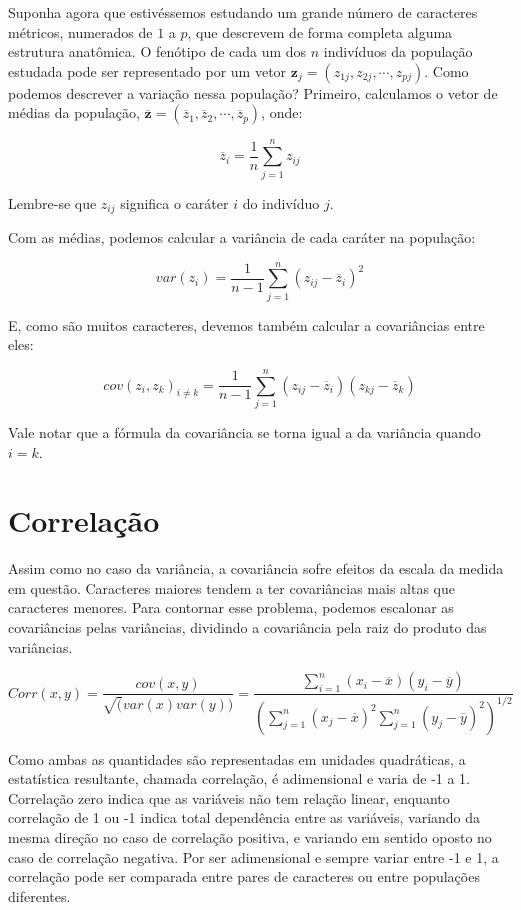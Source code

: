 \documentclass[portuges,]{tufte-handout}
\begin{document}
Suponha agora que estivéssemos estudando um grande número de caracteres
métricos, numerados de $1$ a $p$, que descrevem de forma completa alguma
estrutura anatômica. O fenótipo de cada um dos $n$ indivíduos da
população estudada pode ser representado por um vetor
$\mathbf{z}_j = (z_{1j}, z_{2j}, \cdots, z_{pj})$. Como podemos
descrever a variação nessa população? Primeiro, calculamos o vetor de
médias da população,
$\mathbf{\overline z} = (\overline z_1, \overline z_2, \cdots, \overline z_p)$,
onde:

\[
\overline z_i = \frac{1}{n} \sum_{j=1}^n z_{ij}
\]

Lembre-se que $z_{ij}$ significa o caráter $i$ do indivíduo $j$.

Com as médias, podemos calcular a variância de cada caráter na
população:

\[
var(z_i) = \frac{1}{n-1} \sum_{j=1}^n (z_{ij} - \overline z_i)^2
\]

E, como são muitos caracteres, devemos também calcular a covariâncias
entre eles:

\[
cov(z_i, z_k)_{i \ne k} = \frac{1}{n-1} \sum_{j=1}^n (z_{ij} - \overline z_i)(z_{kj} - \overline z_k)
\]

Vale notar que a fórmula da covariância se torna igual a da variância
quando $i=k$.

\section{Correlação}\label{correlauxe7uxe3o}

Assim como no caso da variância, a covariância sofre efeitos da escala
da medida em questão. Caracteres maiores tendem a ter covariâncias mais
altas que caracteres menores. Para contornar esse problema, podemos
escalonar as covariâncias pelas variâncias, dividindo a covariância pela
raiz do produto das variâncias.

\[
Corr(x, y) = \frac{cov(x, y)}{\sqrt(var(x)var(y))} = \frac{\sum_{i=1}^n (x_i - \overline x)(y_i - \overline y)}{(\sum_{j=1}^n (x_j - \overline x)^2\sum_{j=1}^n(y_j - \overline y)^2)^{1/2}}
\]

Como ambas as quantidades são representadas em unidades quadráticas, a
estatística resultante, chamada correlação, é adimensional e varia de -1
a 1. Correlação zero indica que as variáveis não tem relação linear,
enquanto correlação de 1 ou -1 indica total dependência entre as
variáveis, variando da mesma direção no caso de correlação positiva, e
variando em sentido oposto no caso de correlação negativa. Por ser
adimensional e sempre variar entre -1 e 1, a correlação pode ser
comparada entre pares de caracteres ou entre populações diferentes.
\end{document}
